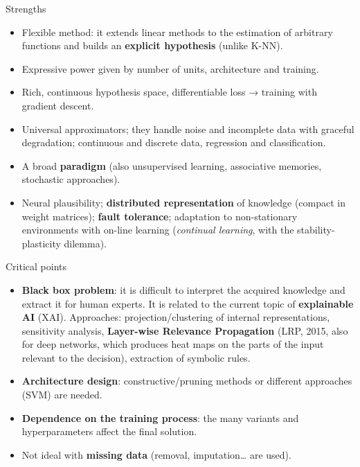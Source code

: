 \begin{boxabstract}{Strengths}

\begin{itemize}
\tightlist
\item
  Flexible method: it extends linear methods to the estimation of
  arbitrary functions and builds an \textbf{explicit hypothesis}
  (unlike K-NN).
\item
  Expressive power given by number of units, architecture and
  training.
\item
  Rich, continuous hypothesis space, differentiable loss → training
  with gradient descent.
\item
  Universal approximators; they handle noise and incomplete data with
  graceful degradation; continuous and discrete data, regression and
  classification.
\item
  A broad \textbf{paradigm} (also unsupervised learning, associative
  memories, stochastic approaches).
\item
  Neural plausibility; \textbf{distributed representation} of
  knowledge (compact in weight matrices); \textbf{fault tolerance};
  adaptation to non-stationary environments with on-line learning
  (\emph{continual learning}, with the stability-plasticity dilemma).
\end{itemize}

\end{boxabstract}

\begin{boxwarning}{Critical points}

\begin{itemize}
\tightlist
\item
  \textbf{Black box problem}: it is difficult to interpret the acquired
  knowledge and extract it for human experts. It is related to the
  current topic of \textbf{explainable AI} (XAI). Approaches:
  projection/clustering of internal representations, sensitivity
  analysis, \textbf{Layer-wise Relevance Propagation} (LRP, 2015, also
  for deep networks, which produces heat maps on the parts of the input
  relevant to the decision), extraction of symbolic rules.
\item
  \textbf{Architecture design}: constructive/pruning methods or
  different approaches (SVM) are needed.
\item
  \textbf{Dependence on the training process}: the many variants and
  hyperparameters affect the final solution.
\item
  Not ideal with \textbf{missing data} (removal, imputation\ldots{} are
  used).
\end{itemize}

\end{boxwarning}

